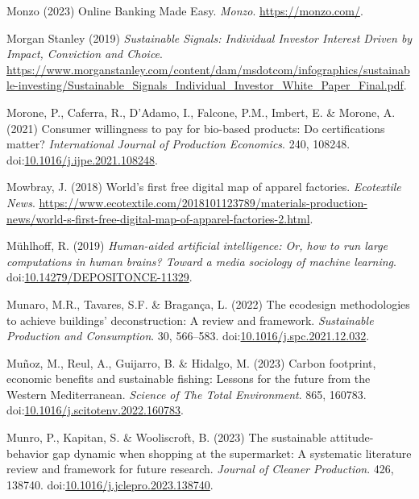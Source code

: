 \documentclass[
  letterpaper,
  DIV=11,
  numbers=noendperiod]{scrartcl}
\newlength{\cslhangindent}
\newenvironment{CSLReferences}[2] %
 {\begin{list}{}{%
  \setlength{\itemindent}{0pt}
  \setlength{\leftmargin}{0pt}
  \setlength{\parsep}{0pt}
  \ifodd #1
   \setlength{\leftmargin}{\cslhangindent}
   \setlength{\itemindent}{-1\cslhangindent}
  \fi
  \setlength{\itemsep}{#2\baselineskip}}}
 {\end{list}}
\begin{document}
\begin{CSLReferences}{0}{1}
Monzo (2023) Online {Banking Made Easy}. \emph{Monzo}.
\url{https://monzo.com/}.

Morgan Stanley (2019) \emph{Sustainable {Signals}: {Individual Investor
Interest Driven} by {Impact}, {Conviction} and {Choice}}.
\url{https://www.morganstanley.com/content/dam/msdotcom/infographics/sustainable-investing/Sustainable_Signals_Individual_Investor_White_Paper_Final.pdf}.

Morone, P., Caferra, R., D'Adamo, I., Falcone, P.M., Imbert, E. \&
Morone, A. (2021) Consumer willingness to pay for bio-based products:
{Do} certifications matter? \emph{International Journal of Production
Economics}. 240, 108248.
doi:\href{https://doi.org/10.1016/j.ijpe.2021.108248}{10.1016/j.ijpe.2021.108248}.

Mowbray, J. (2018) World's first free digital map of apparel factories.
\emph{Ecotextile News}.
\url{https://www.ecotextile.com/2018101123789/materials-production-news/world-s-first-free-digital-map-of-apparel-factories-2.html}.

Mühlhoff, R. (2019) \emph{Human-aided artificial intelligence: {Or}, how
to run large computations in human brains? {Toward} a media sociology of
machine learning}.
doi:\href{https://doi.org/10.14279/DEPOSITONCE-11329}{10.14279/DEPOSITONCE-11329}.

Munaro, M.R., Tavares, S.F. \& Bragança, L. (2022) The ecodesign
methodologies to achieve buildings' deconstruction: {A} review and
framework. \emph{Sustainable Production and Consumption}. 30, 566--583.
doi:\href{https://doi.org/10.1016/j.spc.2021.12.032}{10.1016/j.spc.2021.12.032}.

Muñoz, M., Reul, A., Guijarro, B. \& Hidalgo, M. (2023) Carbon
footprint, economic benefits and sustainable fishing: {Lessons} for the
future from the {Western Mediterranean}. \emph{Science of The Total
Environment}. 865, 160783.
doi:\href{https://doi.org/10.1016/j.scitotenv.2022.160783}{10.1016/j.scitotenv.2022.160783}.

Munro, P., Kapitan, S. \& Wooliscroft, B. (2023) The sustainable
attitude-behavior gap dynamic when shopping at the supermarket: {A}
systematic literature review and framework for future research.
\emph{Journal of Cleaner Production}. 426, 138740.
doi:\href{https://doi.org/10.1016/j.jclepro.2023.138740}{10.1016/j.jclepro.2023.138740}.


\end{CSLReferences}
\end{document}
